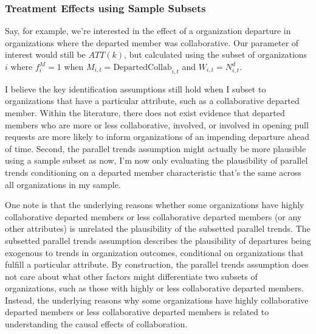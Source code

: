 \documentclass[12pt,notitlepage]{article}
\begin{document}
\subsubsection{Treatment Effects using Sample Subsets} \label{sec:att_subset}
Say, for example, we're interested in the effect of a organization departure in organizations where the departed member was collaborative. Our parameter of interest would still be $ATT(k)$, but calculated using the subset of organizations $i$ where $f_i^M = 1$ when $M_{i,t} = \mathrm{DepartedCollab}_{i,t}$ and $W_{i,t} = N_{i,t}^d$. 

I believe the key identification assumptions still hold when I subset to organizations that have a particular attribute, such as a collaborative departed member. Within the literature, there does not exist evidence that departed members who are more or less collaborative, involved, or involved in opening pull requests are more likely to inform organizations of an impending departure ahead of time. Second, the parallel trends assumption might actually be more plausible using a sample subset as now, I'm now only evaluating the plausibility of parallel trends conditioning on a departed member characteristic that's the same across all organizations in my sample.

One note is that the underlying reasons whether some organizations have highly collaborative departed members or less collaborative departed members (or any other attributes) is unrelated the plausibility of the subsetted parallel trends. The subsetted parallel trends assumption describes the plausibility of departures being exogenous to trends in organization outcomes, conditional on organizations that fulfill a particular attribute. By construction, the parallel trends assumption does not care about what other factors might differentiate two subsets of organizations, such as those with highly or less collaborative departed members. Instead, the underlying reasons why some organizations have highly collaborative departed members or less collaborative departed members is related to understanding the causal effects of collaboration. 
\end{document}
